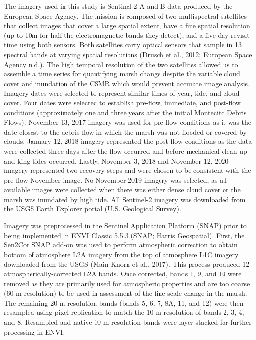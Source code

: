 \documentclass[
]{article}
\begin{document}
The imagery used in this study is Sentinel-2 A and B data produced by
the European Space Agency. The mission is composed of two multispectral
satellites that collect images that cover a large spatial extent, have a
fine spatial resolution (up to 10m for half the electromagnetic bands
they detect), and a five day revisit time using both sensors. Both
satellites carry optical sensors that sample in 13 spectral bands at
varying spatial resolutions (Drusch et al., 2012; European Space Agency
n.d.). The high temporal resolution of the two satellites allowed us to
assemble a time series for quantifying marsh change despite the variable
cloud cover and inundation of the CSMR which would prevent accurate
image analysis. Imagery dates were selected to represent similar times
of year, tide, and cloud cover. Four dates were selected to establish
pre-flow, immediate, and post-flow conditions (approximately one and
three years after the initial Montecito Debris Flows). November 13, 2017
imagery was used for pre-flow conditions as it was the date closest to
the debris flow in which the marsh was not flooded or covered by clouds.
January 12, 2018 imagery represented the post-flow conditions as the
data were collected three days after the flow occurred and before
mechanical clean up and king tides occurred. Lastly, November 3, 2018
and November 12, 2020 imagery represented two recovery steps and were
chosen to be consistent with the pre-flow November image. No November
2019 imagery was selected, as all available images were collected when
there was either dense cloud cover or the marsh was inundated by high
tide. All Sentinel-2 imagery was downloaded from the USGS Earth Explorer
portal (U.S. Geological Survey).

Imagery was preprocessed in the Sentinel Application Platform (SNAP)
prior to being implemented in ENVI Classic 5.5.3 (SNAP; Harris
Geospatial). First, the Sen2Cor SNAP add-on was used to perform
atmospheric correction to obtain bottom of atmosphere L2A imagery from
the top of atmosphere L1C imagery downloaded from the USGS (Main-Knorn
et al., 2017). This process produced 12 atmospherically-corrected L2A
bands. Once corrected, bands 1, 9, and 10 were removed as they are
primarily used for atmospheric properties and are too coarse (60 m
resolution) to be used in assessment of the fine scale change in the
marsh. The remaining 20 m resolution bands (bands 5, 6, 7, 8A, 11, and
12) were then resampled using pixel replication to match the 10 m
resolution of bands 2, 3, 4, and 8. Resampled and native 10 m resolution
bands were layer stacked for further processing in ENVI.
\end{document}
